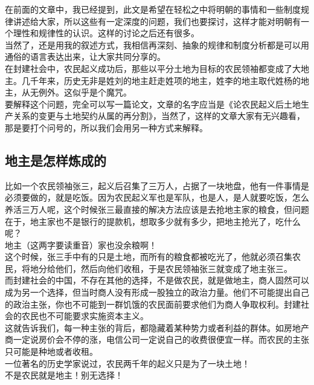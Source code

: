 \begin{multicols}{\theparacolNo}
在前面的文章中，我已经提到，此文是希望在轻松之中将明朝的事情和一些制度规律讲述给大家，所以这些有一定深度的问题，我们也要探讨，这样才能对明朝有一个理性和规律性的认识。这样的讨论之后还有很多。\\

当然了，还是用我的叙述方式，我相信再深刻、抽象的规律和制度分析都是可以用通俗的语言表达出来，让大家共同分享的。\\

在封建社会中，农民起义成功后，那些以平分土地为目标的农民领袖都变成了大地主。几千年来，历史无非是姓刘的地主赶走姓项的地主，姓李的地主取代姓杨的地主，从无例外。这似乎是个魔咒。\\

要解释这个问题，完全可以写一篇论文，文章的名字应当是《论农民起义后土地生产关系的变更与土地契约从属的再分割》，当然了，这样的文章大家有无兴趣看，那是要打个问号的，所以我们会用另一种方式来解释。\\

\subsection{地主是怎样炼成的}
比如一个农民领袖张三，起义后召集了三万人，占据了一块地盘，他有一件事情是必须要做的，就是吃饭。因为农民起义军也是军队，也是人，是人就要吃饭，怎么养活三万人呢，这个时候张三最直接的解决方法应该是去抢地主家的粮食，但问题在于，地主家也不是银行的提款机，想取多少就有多少，把地主抢光了，吃什么呢？\\

地主（这两字要读重音）家也没余粮啊！\\

这个时候，张三手中有的只是土地，而所有的粮食都被吃光了，他就必须召集农民，将地分给他们，然后向他们收租，于是农民领袖张三就变成了地主张三。\\

而封建社会的中国，不存在其他的选择，不是做农民，就是做地主，商人固然可以成为另一个选择，但当时商人没有形成一股独立的政治力量。他们不可能提出自己的政治主张，你也不可能到一群饥饿的农民面前要求他们为商人争取权利。封建社会的农民也不可能要求实施资本主义。\\

这就告诉我们，每一种主张的背后，都隐藏着某种势力或者利益的群体。如房地产商一定说房价会不停的涨，电信公司一定说自己的收费很便宜一样。而农民的主张只可能是种地或者收租。\\

一位著名的历史学家说过，农民两千年的起义只是为了一块土地！\\

不是农民就是地主！别无选择！\\
\ifnum{}
	\end{multicols}
\fi
\newpage

